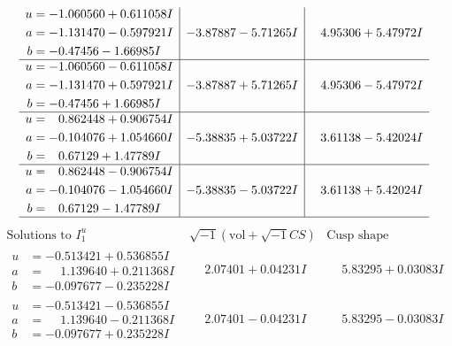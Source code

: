 \documentclass[1p]{elsarticle_modified}
\theoremstyle{definition}
\newcommand{\I}{\sqrt{-1}}
\begin{document}
$$\begin{array}{c|c|c}
\begin{aligned}
u &= -1.060560 + 0.611058 I \\
a &= -1.131470 - 0.597921 I \\
b &= -0.47456 - 1.66985 I\end{aligned}
 & -3.87887 - 5.71265 I & \phantom{-}4.95306 + 5.47972 I \\ \hline\begin{aligned}
u &= -1.060560 - 0.611058 I \\
a &= -1.131470 + 0.597921 I \\
b &= -0.47456 + 1.66985 I\end{aligned}
 & -3.87887 + 5.71265 I & \phantom{-}4.95306 - 5.47972 I \\ \hline\begin{aligned}
u &= \phantom{-}0.862448 + 0.906754 I \\
a &= -0.104076 + 1.054660 I \\
b &= \phantom{-}0.67129 + 1.47789 I\end{aligned}
 & -5.38835 + 5.03722 I & \phantom{-}3.61138 - 5.42024 I \\ \hline\begin{aligned}
u &= \phantom{-}0.862448 - 0.906754 I \\
a &= -0.104076 - 1.054660 I \\
b &= \phantom{-}0.67129 - 1.47789 I\end{aligned}
 & -5.38835 - 5.03722 I & \phantom{-}3.61138 + 5.42024 I\\
 \hline 
 \end{array}$$\newpage$$\begin{array}{c|c|c}  
\text{Solutions to }I^u_{1}& \I (\text{vol} + \sqrt{-1}CS) & \text{Cusp shape}\\
 \hline 
\begin{aligned}
u &= -0.513421 + 0.536855 I \\
a &= \phantom{-}1.139640 + 0.211368 I \\
b &= -0.097677 - 0.235228 I\end{aligned}
 & \phantom{-}2.07401 + 0.04231 I & \phantom{-}5.83295 + 0.03083 I \\ \hline\begin{aligned}
u &= -0.513421 - 0.536855 I \\
a &= \phantom{-}1.139640 - 0.211368 I \\
b &= -0.097677 + 0.235228 I\end{aligned}
 & \phantom{-}2.07401 - 0.04231 I & \phantom{-}5.83295 - 0.03083 I \\ \hline\begin{aligned}

\end{aligned}
\end{array}$$
\end{document}
